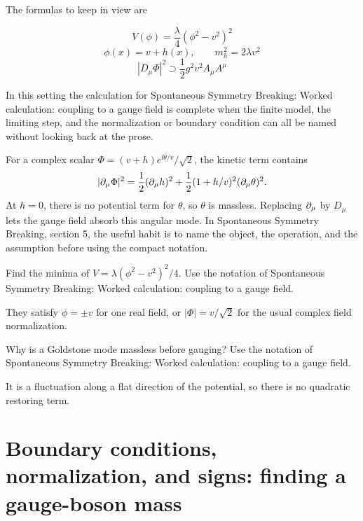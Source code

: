 The formulas to keep in view are

\[
  V(\phi)=\frac{\lambda}{4}(\phi^2-v^2)^2
\]
\[
  \phi(x)=v+h(x),\qquad m_h^2=2\lambda v^2
\]
\[
  |D_\mu\Phi|^2\supset \frac12g^2v^2A_\mu A^\mu
\]

In this setting the calculation for Spontaneous Symmetry Breaking: Worked calculation: coupling to a gauge field is complete when the finite model, the limiting step, and the normalization or boundary condition can all be named without looking back at the prose.




\begin{example}
For a complex scalar \(\Phi=(v+h)e^{\ii\theta/v}/\sqrt2\), the kinetic term contains
\[
  |\partial_\mu\Phi|^2=\frac12(\partial_\mu h)^2+\frac12(1+h/v)^2(\partial_\mu\theta)^2.
\]
At \(h=0\), there is no potential term for \(\theta\), so \(\theta\) is massless.  Replacing \(\partial_\mu\) by \(D_\mu\) lets the gauge field absorb this angular mode.  In Spontaneous Symmetry Breaking, section 5, the useful habit is to name the object, the operation, and the assumption before using the compact notation.
\end{example}



\begin{exercise}
Find the minima of \(V=\lambda(\phi^2-v^2)^2/4\).  Use the notation of Spontaneous Symmetry Breaking: Worked calculation: coupling to a gauge field.
\begin{answer}
They satisfy \(\phi=\pm v\) for one real field, or \(|\Phi|=v/\sqrt2\) for the usual complex field normalization.
\end{answer}
\end{exercise}

\begin{exercise}
Why is a Goldstone mode massless before gauging?  Use the notation of Spontaneous Symmetry Breaking: Worked calculation: coupling to a gauge field.
\begin{answer}
It is a fluctuation along a flat direction of the potential, so there is no quadratic restoring term.
\end{answer}
\end{exercise}



\section{Boundary conditions, normalization, and signs: finding a gauge-boson mass}

